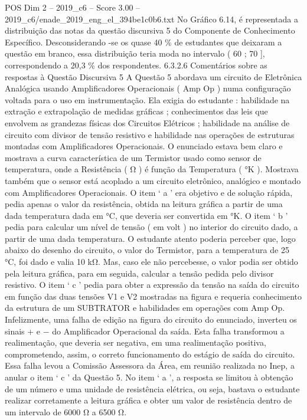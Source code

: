 \begin{textsample}{POS Dim 2 – 2019\_c6 – Score 3.00 – 2019\_c6/enade\_2019\_eng\_el\_394be1c0b6.txt}
No Gráfico 6.14, é representada a distribuição das notas da questão discursiva 5 do Componente de Conhecimento Específico.
Desconsiderando -se os quase 40 \% de estudantes que deixaram a questão em branco, essa distribuição teria moda no intervalo ( 60 ; 70 ], correspondendo a 20,3 \% dos respondentes. 6.3.2.6 Comentários sobre as respostas à Questão Discursiva 5 A Questão 5 abordava um circuito de Eletrônica Analógica usando Amplificadores Operacionais ( Amp Op ) numa configuração voltada para o uso em instrumentação.
Ela exigia do estudante : habilidade na extração e extrapolação de medidas gráficas ; conhecimentos das leis que envolvem as grandezas físicas dos Circuitos Elétricos ; habilidade na análise de circuito com divisor de tensão resistivo e habilidade nas operações de estruturas montadas com Amplificadores Operacionais.
O enunciado estava bem claro e mostrava a curva característica de um Termistor usado como sensor de temperatura, onde a Resistência ( Ω ) é função da Temperatura ( {\EmojiFont °}K ).
Mostrava também que o sensor está acoplado a um circuito eletrônico, analógico e montado com Amplificadores Operacionais.
O item ‘ a ’ era objetivo e de solução rápida, pedia apenas o valor da resistência, obtida na leitura gráfica a partir de uma dada temperatura dada em {\EmojiFont °}C, que deveria ser convertida em {\EmojiFont °}K.
O item ‘ b ’ pedia para calcular um nível de tensão ( em volt ) no interior do circuito dado, a partir de uma dada temperatura.
O estudante atento poderia perceber que, logo abaixo do desenho do circuito, o valor do Termistor, para a temperatura de 25 {\EmojiFont °}C, foi dado e valia 10 kΩ.
Mas, caso ele não percebesse, o valor podia ser obtido pela leitura gráfica, para em seguida, calcular a tensão pedida pelo divisor resistivo.
O item ‘ c ’ pedia para obter a expressão da tensão na saída do circuito em função das duas tensões V1 e V2 mostradas na figura e requeria conhecimento da estrutura de um SUBTRATOR e habilidades em operações com Amp Op.
Infelizmente, uma falha de edição na figura do circuito do enunciado, inverteu os sinais + e − do Amplificador Operacional da saída.
Esta falha transformou a realimentação, que deveria ser negativa, em uma realimentação positiva, comprometendo, assim, o correto funcionamento do estágio de saída do circuito.
Essa falha levou a Comissão Assessora da Área, em reunião realizada no Inep, a anular o item ‘ c ’ da Questão 5.
No item ‘ a ’, a resposta se limitou à obtenção de um número e uma unidade de resistência elétrica, ou seja, bastava o estudante realizar corretamente a leitura gráfica e obter um valor de resistência dentro de um intervalo de 6000 Ω a 6500 Ω.

\end{textsample}
